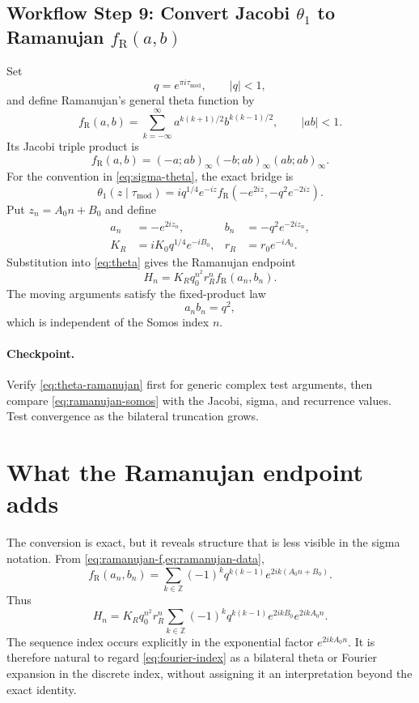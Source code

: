 \documentclass[11pt]{article}
\newcommand{\workflowstep}[1]{\subsection{Workflow Step #1}}
\newcommand{\taumod}{\tau_{\mathrm{mod}}}
\newcommand{\RamF}{f_{\mathrm R}}
\begin{document}
\workflowstep{9: Convert Jacobi $\theta_1$ to Ramanujan $\RamF(a,b)$}
Set
\begin{equation}
 q=e^{\pi i\taumod},\qquad |q|<1,
 \label{eq:nome}
\end{equation}
and define Ramanujan's general theta function by
\begin{equation}
 \RamF(a,b)=\sum_{k=-\infty}^{\infty}
 a^{k(k+1)/2}b^{k(k-1)/2},\qquad |ab|<1.
 \label{eq:ramanujan-f}
\end{equation}
Its Jacobi triple product is
\begin{equation}
 \RamF(a,b)=(-a;ab)_\infty(-b;ab)_\infty(ab;ab)_\infty.
 \label{eq:triple-product}
\end{equation}
For the convention in \cref{eq:sigma-theta}, the exact bridge is
\begin{equation}
 \theta_1(z\mid\taumod)
 =i q^{1/4}e^{-iz}
 \RamF\!\left(-e^{2iz},-q^2e^{-2iz}\right).
 \label{eq:theta-ramanujan}
\end{equation}
Put $z_n=A_0n+B_0$ and define
\begin{align}
 a_n&=-e^{2iz_n},&
 b_n&=-q^2e^{-2iz_n},\\
 K_R&=iK_0q^{1/4}e^{-iB_0},&
 r_R&=r_0e^{-iA_0}.
 \label{eq:ramanujan-data}
\end{align}
Substitution into \cref{eq:theta} gives the Ramanujan endpoint
\begin{equation}
 \boxed{
 H_n=K_Rq_0^{n^2}r_R^n\RamF(a_n,b_n).}
 \label{eq:ramanujan-somos}
\end{equation}
The moving arguments satisfy the fixed-product law
\begin{equation}
 \boxed{a_nb_n=q^2,}
 \label{eq:fixed-product}
\end{equation}
which is independent of the Somos index $n$.

\paragraph{Checkpoint.}
Verify \cref{eq:theta-ramanujan} first for generic complex test arguments, then
compare \cref{eq:ramanujan-somos} with the Jacobi, sigma, and recurrence values.
Test convergence as the bilateral truncation grows.

\section{What the Ramanujan endpoint adds}
The conversion is exact, but it reveals structure that is less visible in the
sigma notation.  From \cref{eq:ramanujan-f,eq:ramanujan-data},
\begin{equation}
 \RamF(a_n,b_n)=
 \sum_{k\in\mathbb Z}(-1)^kq^{k(k-1)}e^{2ik(A_0n+B_0)}.
 \label{eq:bilateral}
\end{equation}
Thus
\begin{equation}
 H_n=K_Rq_0^{n^2}r_R^n
 \sum_{k\in\mathbb Z}(-1)^kq^{k(k-1)}
 e^{2ikB_0}e^{2ikA_0n}.
 \label{eq:fourier-index}
\end{equation}
The sequence index occurs explicitly in the exponential factor
$e^{2ikA_0n}$.  It is therefore natural to regard \cref{eq:fourier-index} as a
bilateral theta or Fourier expansion in the discrete index, without assigning
it an interpretation beyond the exact identity.
\end{document}
